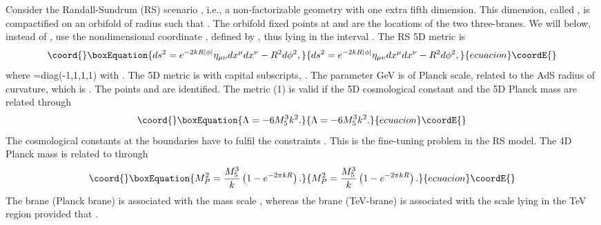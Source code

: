 \documentclass[a4paper,12pt]{article}
\begin{document}
Consider the Randall-Sundrum (RS) scenario \cite{randall99}, i.e., a non-factorizable geometry with one extra fifth dimension. This dimension, called \coordHE{}, is compactified on an orbifold \coordHE{} of radius \coordHE{} such that \coordHE{}. The orbifold fixed points at \coordHE{} and \coordHE{} are the locations of the two three-branes. We will below, instead of \coordHE{}, use the nondimensional coordinate \myHighlight{$\phi$}\coordHE{}, defined by \coordHE{}, thus lying in the interval \myHighlight{$[-\pi, \pi]$}\coordHE{}. The RS  5D metric is
\begin{equation}\coord{}\boxEquation{
ds^2=e^{-2kR|\phi|}\eta_{\mu\nu} dx^\mu dx^\nu -R^2 d\phi^2,
}{
ds^2=e^{-2kR|\phi|}\eta_{\mu\nu} dx^\mu dx^\nu -R^2 d\phi^2,
}{ecuacion}\coordE{}\end{equation}
\label{1}
where \myHighlight{$\eta_{\mu\nu}$}\coordHE{}=diag(-1,1,1,1) with \coordHE{}. The 5D metric is \coordHE{} with capital subscripts, \coordHE{}. The parameter \coordHE{} GeV is of Planck scale, related to the AdS radius of curvature, which is \coordHE{}. The points \coordHE{} and \coordHE{} are identified. The metric (1) is valid if the 5D cosmological constant \myHighlight{$\Lambda$}\coordHE{} and the 5D Planck mass \coordHE{} are related through 
\begin{equation}\coord{}\boxEquation{
\Lambda=-6M_5^3k^2.
}{
\Lambda=-6M_5^3k^2.
}{ecuacion}\coordE{}\end{equation}
\label{2}
The cosmological constants at the boundaries have to fulfil the constraints \coordHE{}. This is the fine-tuning problem in the RS model. The 4D Planck mass \coordHE{} is related to \coordHE{} through
\begin{equation}\coord{}\boxEquation{
M_P^2=\frac{M_5^3}{k}\left( 1-e^{-2\pi kR} \right).
}{
M_P^2=\frac{M_5^3}{k}\left( 1-e^{-2\pi kR} \right).
}{ecuacion}\coordE{}\end{equation}
\label{3}
The \coordHE{} brane (Planck brane) is associated with the mass scale \coordHE{}, whereas the \myHighlight{$\phi=\pi$}\coordHE{} brane (TeV-brane) is associated with the scale \coordHE{} lying in the TeV region provided that \coordHE{}.
\end{document}
